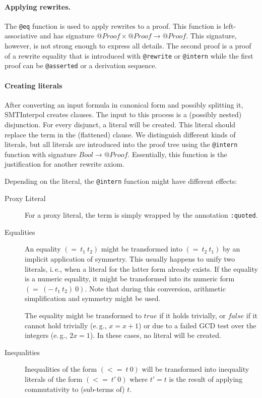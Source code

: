 \documentclass[a4paper]{article}
\newcommand\si{SMTInterpol\xspace}
\begin{document}
\paragraph{Applying rewrites.}  The \verb+@eq+ function is used to apply
rewrites to a proof.  This function is left-associative and has signature
$@Proof\times@Proof\rightarrow @Proof$.  This signature, however, is not
strong enough to express all details.  The second proof is a proof of a
rewrite equality that is introduced with \verb+@rewrite+ or \verb+@intern+
while the first proof can be \verb+@asserted+ or a derivation sequence.

\paragraph{Creating literals}  After converting an input formula in canonical
form and possibly splitting it, \si creates clauses.  The input to this
process is a (possibly nested) disjunction.  For every disjunct, a literal
will be created.  This literal should replace the term in the (flattened)
clause.  We distinguish different kinds of literals, but all literals are
introduced into the proof tree using the \verb+@intern+ function with
signature $Bool\rightarrow @Proof$.  Essentially, this function is the
justification for another rewrite axiom.

Depending on the literal, the \verb+@intern+ function might have different
effects:
\begin{description}
\item[Proxy Literal] For a proxy literal, the term is simply wrapped by the
  annotation \verb+:quoted+.
\item[Equalities] An equality $(=\ t_1\ t_2)$ might be transformed into
  $(=\ t_2\ t_1)$ by an implicit application of symmetry.  This usually
  happens to unify two literals, i.\,e., when a literal for the latter form
  already exists.  If the equality is a numeric equality, it might be
  transformed into its numeric form $(=\ (-\ t_1\ t_2)\ 0)$.  Note that during
  this conversion, arithmetic simplification and symmetry might be used.

  The equality might be transformed to $true$ if it holds trivially, or
  $false$ if it cannot hold trivially (e.\,g., $x=x+1$) or due to a failed GCD
  test over the integers (e.\,g., $2x=1$).  In these cases, no literal will be
  created.
\item[Inequalities] Inequalities of the form $(<=\ t\ 0)$ will be transformed
  into inequality literals of the form $(<=\ t'\ 0)$ where $t'=t$ is the
  result of applying commutativity to (sub-terms of) $t$.
\end{description}
\end{document}

